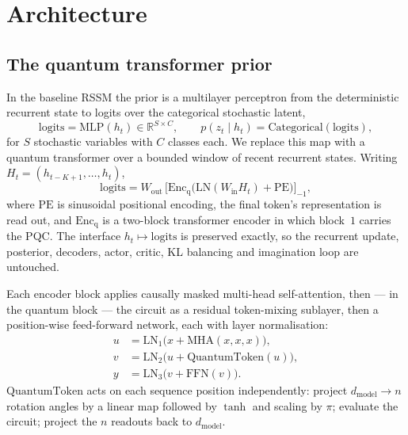 \documentclass[11pt,onecolumn]{article}
\begin{document}
\section{Architecture}\label{sec:arch}
\subsection{The quantum transformer prior}
In the baseline RSSM the prior is a multilayer perceptron from the
deterministic recurrent state to logits over the categorical stochastic
latent,
\begin{equation}
  \mathrm{logits} = \mathrm{MLP}(h_t) \in \mathbb{R}^{S \times C},
  \qquad
  p(z_t \mid h_t) = \mathrm{Categorical}(\mathrm{logits}),
\end{equation}
for $S$ stochastic variables with $C$ classes each. We replace this map
with a quantum transformer over a bounded window of recent recurrent
states. Writing $H_t = (h_{t-K+1}, \dots, h_t)$,
\begin{equation}
  \mathrm{logits} = W_{\mathrm{out}}\,
  \Big[\mathrm{Enc}_{\mathrm{q}}\!\big(
      \mathrm{LN}(W_{\mathrm{in}} H_t) + \mathrm{PE}\big)\Big]_{-1},
\end{equation}
where $\mathrm{PE}$ is sinusoidal positional encoding, the final token's
representation is read out, and $\mathrm{Enc}_{\mathrm{q}}$ is a
two-block transformer encoder in which block~$1$ carries the PQC. The
interface $h_t \mapsto \mathrm{logits}$ is preserved exactly, so the
recurrent update, posterior, decoders, actor, critic, KL balancing and
imagination loop are untouched.

Each encoder block applies causally masked multi-head self-attention,
then --- in the quantum block --- the circuit as a residual token-mixing
sublayer, then a position-wise feed-forward network, each with layer
normalisation:
\begin{align}
  u &= \mathrm{LN}_1\big(x + \mathrm{MHA}(x, x, x)\big), \\
  v &= \mathrm{LN}_2\big(u + \mathrm{QuantumToken}(u)\big), \\
  y &= \mathrm{LN}_3\big(v + \mathrm{FFN}(v)\big).
\end{align}
$\mathrm{QuantumToken}$ acts on each sequence position independently:
project $d_{\mathrm{model}} \to n$ rotation angles by a linear map
followed by $\tanh$ and scaling by $\pi$; evaluate the circuit; project
the $n$ readouts back to $d_{\mathrm{model}}$.
\end{document}
